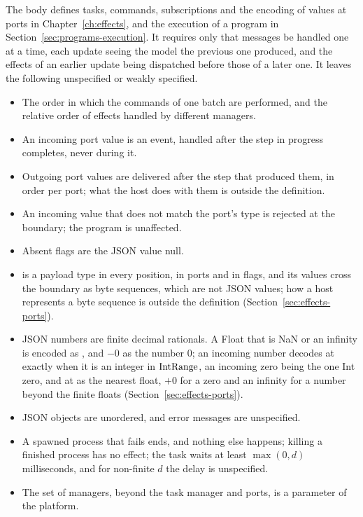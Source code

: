 The body defines tasks, commands, subscriptions and the encoding of values at
ports in Chapter~\ref{ch:effects}, and the execution of a program in
Section~\ref{sec:programs-execution}. It requires only that messages be
handled one at a time, each update seeing the model the previous one
produced, and the effects of an earlier update being dispatched before those
of a later one. %
It leaves the following unspecified or weakly specified.
\begin{itemize}
\item The order in which the commands of one batch are performed, and the
  relative order of effects handled by different managers. %
\item An incoming port value is an event, handled after the step in progress
  completes, never during it. %
\item Outgoing port values are delivered after the step that produced them,
  in order per port; what the host does with them is outside the definition.
\item An incoming value that does not match the port's type is rejected at
  the boundary; the program is unaffected. %
\item Absent flags are the JSON value null. %
\item {} is a payload type in every position, in ports and in flags,
  and its values cross the boundary as byte sequences, which are not JSON
  values; how a host represents a byte sequence is outside the definition
  (Section~\ref{sec:effects-ports}). %
\item JSON numbers are finite decimal rationals. A Float that is NaN or an
  infinity is encoded as , and $-0$ as the number $0$; an incoming
  number decodes at  exactly when it is an integer in $\mathrm{IntRange}$, an
  incoming zero being the one Int zero, and at  as the nearest float,
  $+0$ for a zero and an infinity for a number beyond the finite floats
  (Section~\ref{sec:effects-ports}). %
\item JSON objects are unordered, and error messages are unspecified. %
\item A spawned process that fails ends, and nothing else happens; killing a
  finished process has no effect; the task  waits at least
  $\max(0,d)$ milliseconds, and for non-finite $d$ the delay is unspecified.
\item The set of managers, beyond the task manager and ports, is a
  parameter of the platform. %
\end{itemize}

